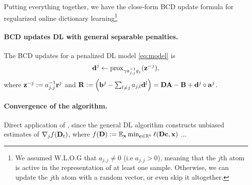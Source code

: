   

Putting everything together, we have the close-form BCD update formula for regularized online dictionary learning\footnote{We assumed W.L.O.G that $a_{j,j} \ne 0$ (i.e $a_{j,j} > 0$), meaning that the $j$th atom is active in the representation of at least one sample. Otherwise, we can update the $j$th atom with a random vector, or even skip it altogether.}
\begin{mdframed}
  \paragraph{BCD updates DL with general separable penalties.}
  The BCD updates for a penalized DL model \eqref{eq:model} is
\begin{equation}
  \mathbf{d}^j \leftarrow \operatorname{prox}_{\gamma a_{j,j}^{-1}g_j}(\mathbf{z}^{-j}),
\end{equation}
where $\mathbf{z}^{-j} := a_{j,j}^{-1}\mathbf{r}^j$ and $\mathbf{R} := \left(\mathbf{b}^j-\sum\nolimits_{l \ne j}a_{j,l}\mathbf{d}^l\right) = \mathbf{DA} - \mathbf{B} + \mathbf{d}^j \circ \mathbf{a}^j $.
\end{mdframed}

\paragraph{Convergence of the algorithm.}
Direct application of \cite{fercoq2015}, since the general DL algorithm constructs unbiased
estimates of $\nabla_j f(\mathbf{D}_t)$, where $f(\mathbf{D}) := \mathbb E_{\mathbf{x}}\min_{\mathbf{c} \in \mathbb R^k}\ell (\mathbf{D}\mathbf{c}, \mathbf{x})$ ...


